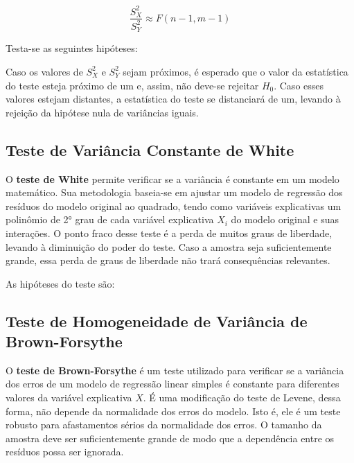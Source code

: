 \documentclass[
]{estat/estat}
\begin{document}
\[ \frac{S^2_X}{S^2_Y} \approx F(n - 1, m - 1) \]

Testa-se as seguintes hipóteses:


Caso os valores de \(S^2_X\) e \(S^2_Y\) sejam próximos, é esperado que
o valor da estatística do teste esteja próximo de um e, assim, não
deve-se rejeitar \(H_0\). Caso esses valores estejam distantes, a
estatística do teste se distanciará de um, levando à rejeição da
hipótese nula de variâncias iguais.

\hypertarget{teste-de-variuxe2ncia-constante-de-white}{%
\subsection{Teste de Variância Constante de
White}\label{teste-de-variuxe2ncia-constante-de-white}}

O \textbf{teste de White} permite verificar se a variância é constante
em um modelo matemático. Sua metodologia baseia-se em ajustar um modelo
de regressão dos resíduos do modelo original ao quadrado, tendo como
variáveis explicativas um polinômio de 2° grau de cada variável
explicativa \(X_i\) do modelo original e suas interações. O ponto fraco
desse teste é a perda de muitos graus de liberdade, levando à diminuição
do poder do teste. Caso a amostra seja suficientemente grande, essa
perda de graus de liberdade não trará consequências relevantes.

As hipóteses do teste são:


\hypertarget{teste-de-homogeneidade-de-variuxe2ncia-de-brown-forsythe}{%
\subsection{Teste de Homogeneidade de Variância de
Brown-Forsythe}\label{teste-de-homogeneidade-de-variuxe2ncia-de-brown-forsythe}}

O \textbf{teste de Brown-Forsythe} é um teste utilizado para verificar
se a variância dos erros de um modelo de regressão linear simples é
constante para diferentes valores da variável explicativa \(X\). É uma
modificação do teste de Levene, dessa forma, não depende da normalidade
dos erros do modelo. Isto é, ele é um teste robusto para afastamentos
sérios da normalidade dos erros. O tamanho da amostra deve ser
suficientemente grande de modo que a dependência entre os resíduos possa
ser ignorada.
\end{document}
